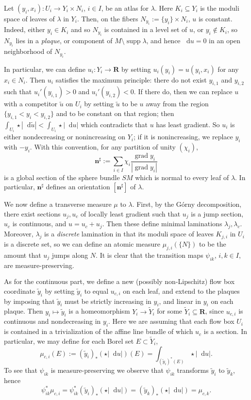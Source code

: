 \documentclass[reqno,10pt]{amsart}
\newcommand{\RR}{\mathbf{R}}
\DeclareMathOperator{\supp}{supp}
\newcommand*\dif{\mathop{}\!\mathrm{d}}
\DeclareMathOperator{\grad}{grad}
\newcommand{\normal}{\mathbf n}
\newcommand{\dfn}[1]{\emph{#1}\index{#1}}
\theoremstyle{definition}
\numberwithin{equation}{section}
\begin{document}
Let $(y_i, x_i): U_i \to Y_i \times N_i$, $i \in I$, be an atlas for $\lambda$.
Here $K_i \subseteq Y_i$ is the moduli space of leaves of $\lambda$ in $Y_i$.
Then, on the fibers $N_{y_i} := \{y_i\} \times N_i$, $u$ is constant.
Indeed, either $y_i \in K_i$ and so $N_{y_i}$ is contained in a level set of $u$, or $y_i \notin K_i$, so $N_{y_i}$ lies in a \dfn{plaque}, or component of $M \setminus \supp \lambda$, and hence $\dif u = 0$ in an open neighborhood of $N_{y_i}$.

In particular, we can define $u_i: Y_i \to \RR$ by setting $u_i(y_i) = u(y_i, x_i)$ for any $x_i \in N_i$.
Then $u_i$ satisfies the maximum principle: there do not exist $y_{i,1}$ and $y_{i,2}$ such that $u_i'(y_{i,1}) > 0$ and $u_i'(y_{i,2}) < 0$.
If there do, then we can replace $u$ with a competitor $\tilde u$ on $U_i$ by setting $\tilde u$ to be $u$ away from the region $\{y_{i,1} < y_i < y_{i,2}\}$ and to be constant on that region; then $\int_{U_i} \star |\dif \tilde u| < \int_{U_i} \star |\dif u|$ which contradicts that $u$ has least gradient.
So $u_i$ is either nondecreasing or nonincreasing on $Y_i$; if it is nonincreasing, we replace $y_i$ with $-y_i$.
With this convention, for any partition of unity $(\chi_i)$,
$$\normal^\sharp := \sum_{i \in I} \chi_i \frac{\grad y_i}{|\grad y_i|}$$
is a global section of the sphere bundle $SM$ which is normal to every leaf of $\lambda$. In particular, $\normal^\sharp$ defines an orientation $[\normal^\sharp]$ of $\lambda$.

We now define a transverse measure $\mu$ to $\lambda$.
First, by the G\'orny decomposition, there exist sections $u_j, u_c$ of locally least gradient such that $u_j$ is a jump section, $u_c$ is continuous, and $u = u_c + u_j$.
Then these define minimal laminations $\lambda_j, \lambda_c$.
Moreover, $\lambda_j$ is a \emph{discrete} lamination in that its moduli space of leaves $K_{j,i}$ in $U_i$ is a discrete set, so we can define an atomic measure $\mu_{j,i}(\{N\})$ to be the amount that $u_j$ jumps along $N$.
It is clear that the transition maps $\psi_{ik}$, $i,k \in I$, are measure-preserving.

As for the continuous part, we define a new (possibly non-Lipschitz) flow box coordinate $\tilde y_i$ by setting $\tilde y_i$ to equal $u_{c,i}$ on each leaf, and extend to the plaques by imposing that $\tilde y_i$ must be strictly increasing in $y_i$, and linear in $y_i$ on each plaque.
Then $y_i \mapsto \tilde y_i$ is a homeomorphism $Y_i \to \tilde Y_i$ for some $\tilde Y_i \subseteq \RR$, since $u_{c,i}$ is continuous and nondecreasing in $y_i$.
Here we are assuming that each flow box $U_i$ is contained in a trivialization of the affine line bundle of which $u_c$ is a section.
In particular, we may define for each Borel set $E \subset \tilde Y_i$,
$$\mu_{c,i}(E) := (\tilde y_i)_*(\star |\dif u|)(E) = \int_{(\tilde y_i)^*(E)} \star |\dif u|.$$
To see that $\psi_{ik}$ is measure-preserving we observe that $\psi_{ik}$ transforms $\tilde y_i$ to $\tilde y_k$, hence
$$\psi_{ik}^* \mu_{c,i} = \psi_{ik}^* (\tilde y_i)_* (\star |\dif u|) = (\tilde y_k)_* (\star |\dif u|) = \mu_{c,k}.$$
\end{document}
